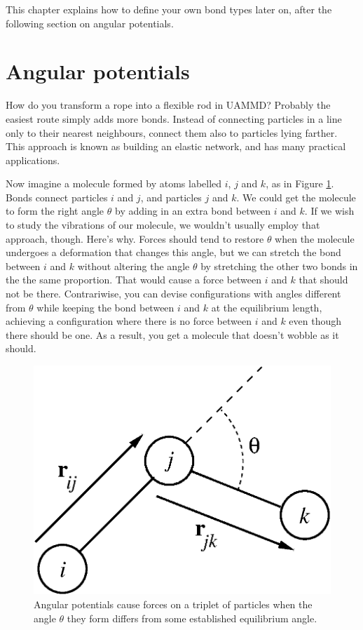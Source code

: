This chapter explains how to define your own bond types later on, after the
following section on angular potentials.

\section{Angular potentials}

How do you transform a rope into a flexible rod in UAMMD? Probably the easiest
route simply adds more bonds. Instead of connecting particles in a line only to
their nearest neighbours, connect them also to particles lying farther. This
approach is known as building an elastic network, and has many practical
applications.

Now imagine a molecule formed by atoms labelled $i$, $j$ and $k$, as in Figure
\ref{angularPotential}. Bonds connect particles $i$ and $j$, and particles $j$
and $k$. We could get the molecule to form the right angle $\theta$ by adding in
an extra bond between $i$ and $k$. If we wish to study the vibrations of our
molecule, we wouldn't usually employ that approach, though. Here's why. Forces
should tend to restore $\theta$ when the molecule undergoes a deformation that
changes this angle, but we can stretch the bond between $i$ and $k$ without
altering the angle $\theta$ by stretching the other two bonds in the the same
proportion. That would cause a force between $i$ and $k$ that should not be
there. Contrariwise, you can devise configurations with angles different from
$\theta$ while keeping the bond between $i$ and $k$ at the equilibrium length,
achieving a configuration where there is no force between $i$ and $k$ even
though there should be one. As a result, you get a molecule that doesn't wobble
as it should.

\begin{figure}
  \centering
  \includegraphics[width = 0.5 \textwidth]{figures/angularSprings.eps}
  \caption{\label{angularPotential}Angular potentials cause forces on a triplet
           of particles when the angle $\theta$ they form differs from some 
           established equilibrium angle.}
\end{figure}

